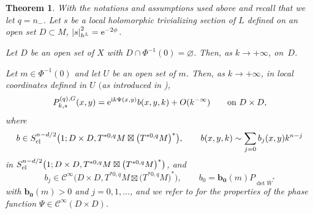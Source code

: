\documentclass[pdftex]{sigma}
\numberwithin{equation}{section}
\newtheorem{Theorem}{Theorem}[section]
\newcommand{\abs}[1]{\left\vert#1\right\vert}
\begin{document}
 	\begin{Theorem}\label{t-gue220914yyd}
 		With the notations and assumptions used above and recall that we let $q=n_-$. Let $s$ be a local holomorphic trivializing section of $L$ defined on an open set $D\subset M$, $\abs{s}^2_{h^L}={\rm e}^{-2\phi}$.
 		
 		Let $D$ be an open set of $X$ with $D\cap \Phi^{-1}(0) =\varnothing$. Then, as $k\rightarrow +\infty$,  on~$D$.
 		
 		Let $m \in \Phi^{-1}(0)$ and let $U$ be an open set of $m$. Then, as $k\rightarrow +\infty$, in local coordinates defined in $U$ $($as introduced in {\rm\cite{hsiaohuang})},
 		\[%
 			P^{(q),G}_{k,s}(x,y)={\rm e}^{{\rm i}k\Psi(x,y)}b(x,y,k)+O(k^{-\infty})\qquad\text{on} \ D\times D,
 		\]
 		where \[b\in S^{n-d/2}_{{\rm cl }}\bigl(1;D\times D,T^{*0,q}M\boxtimes\bigl(T^{*0,q}M\bigr)^*\bigr) ,\qquad b(x,y,k)\sim\sum_{j=0}b_j(x,y)k^{n-j}\] in $S^{n-d/2}_{{\rm cl }}\bigl(1;D\times D,T^{*0,q}M\boxtimes\bigl(T^{*0,q}M\bigr)^*\bigr) $,
 		and \[b_j\in\mathcal{C}^\infty\bigl(D\times D,T^{*0,q}M\boxtimes\bigl(T^{*0,q}M\bigr)^*\bigr) ,\qquad b_0=\mathbf{b_0}(m) P_{\det \overline{W}^*}\]
 with $\mathbf{b_0}(m)> 0$ and $j=0,1,\dots$,
 		and we refer to {\rm\cite[\emph{Theorem} 1.8]{hsiaohuang}} for the properties of the phase function $\Psi\in\mathcal{C}^\infty(D\times D)$.
 	\end{Theorem}
\end{document}
